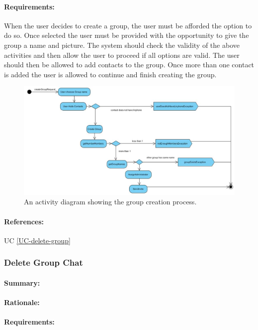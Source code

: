 \documentclass[11pt]{article}
\begin{document}
\paragraph{Requirements:} When the user decides to create a group, the user must be afforded the option to do so. Once selected the user must be provided with the opportunity to give the group a name and picture. The system should check the validity of the above activities and then allow the user to proceed if all options are valid. The user should then be allowed to add contacts to the group. Once more than one contact is added the user is allowed to continue and finish creating the group.
\begin{figure}[H]
\centering
\includegraphics[width=5in]{./images/process-create.jpg}
\caption[Create Group Activity Diagram]{An activity diagram showing the group creation process.}
\label{FR-figure-create-group}
\end{figure}
\paragraph{References:} UC \ref{UC-delete-group}
 
\subsubsection{Delete Group Chat} \label{FR-delete-group}
\paragraph{Summary:}
\paragraph{Rationale:}
\paragraph{Requirements:}
\end{document}
